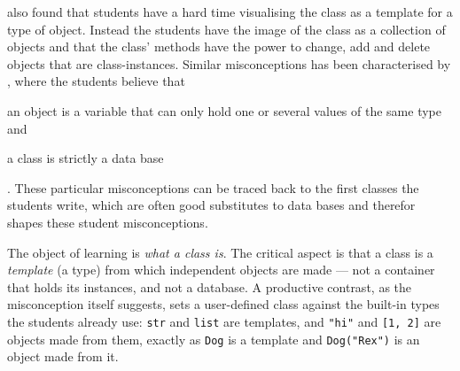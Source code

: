 \autocite{Ragonis2005OOP} also found that students have a hard time 
visualising the class as a template for a type of object. Instead the 
students have the 
image of the class as a collection of objects and that the class' methods 
have the power to change, add and delete objects that are class-instances. 
Similar 
misconceptions has been characterised by \textcite{Holland1997}, where the 
students believe that \begin{enumerate*}
    \item an object is a variable that can only hold one or several values of 
the same type and
    \item a class is strictly a data base
\end{enumerate*}. These particular misconceptions can be traced back to the 
first classes the students write, which are often good substitutes to data 
bases 
and therefor shapes these student misconceptions. 

The object of learning is \emph{what a class is}. The critical aspect is that a
class is a \emph{template} (a type) from which independent objects are made ---
not a container that holds its instances, and not a database. A productive
contrast, as the misconception itself suggests, sets a user-defined class against
the built-in types the students already use: \texttt{str} and
\texttt{list} are templates, and \texttt{"hi"} and
\texttt{[1, 2]} are objects made from them, exactly as
\texttt{Dog} is a template and \texttt{Dog("Rex")} is an
object made from it.


